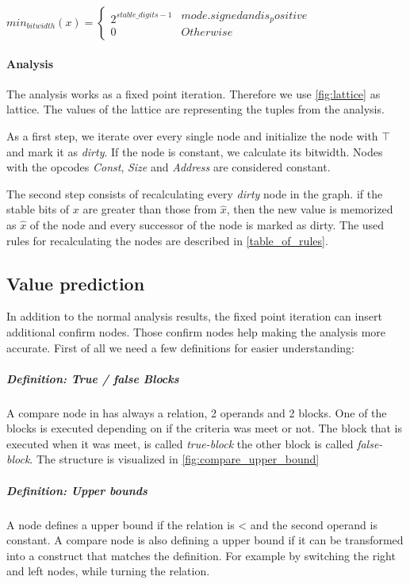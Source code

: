 $
min_{bitwidth}(x)=
\left\{
\begin{array}{l}2^{stable\_digits-1}\\0\end{array}
\begin{array}{l} {mode.signed and is_positive} \\ {Otherwise} \end{array}
\right.
$



\paragraph{Analysis} The analysis works as a fixed point iteration. Therefore we use  \autoref{fig:lattice} as lattice. The values of the lattice are representing the tuples from the analysis.

As a first step, we iterate over every single node and initialize the node with $\top$ and mark it as \textit{dirty}. If the node is constant, we calculate its bitwidth. Nodes with the opcodes \textit{Const}, \textit{Size} and \textit{Address} are considered constant.

The second step consists of recalculating every \textit{dirty} node in the graph. if the stable bits of $x$ are greater than those from $\hat{x}$, then the new value is memorized as $\hat{x}$ of the node and every successor of the node is marked as dirty. The used rules for recalculating the nodes are described in \autoref{table_of_rules}.

\subsection{Value prediction}
In addition to the normal analysis results, the fixed point iteration can insert additional 
confirm nodes. Those confirm nodes help making the analysis more accurate.
First of all we need a few definitions for easier understanding:

\subparagraph{Definition: True / false Blocks}
A compare node in \libFIRM has always a relation, 2 operands and 2 blocks. One of the blocks is executed depending on if the criteria was meet or not. The block that is executed when it was meet, is called \emph{true-block} the other block is called \emph{false-block}. The structure is visualized in \autoref{fig:compare_upper_bound}


\subparagraph{Definition: Upper bounds}
A node defines a upper bound if the relation is < and the second operand is constant.\newline
A compare node is also defining a upper bound if it can be transformed into a construct that matches the definition. For example by switching the right and left nodes, while turning the relation.

